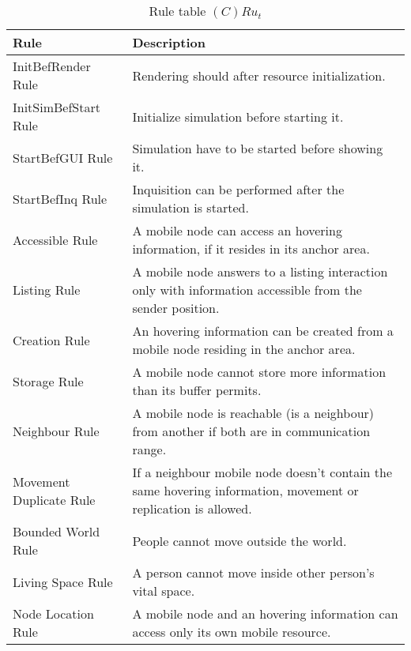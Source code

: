 \begin{table}[H]
	\centering
	\begin{tabular}{|p{4cm}|p{8cm}|}
			\hline
			\textbf{Rule} & \textbf{Description} \\
			\hline
			InitBefRender Rule & Rendering should after resource initialization. \\
			\hline
			InitSimBefStart Rule & Initialize simulation before starting it.  \\
			\hline
			StartBefGUI Rule & Simulation have to be started before showing it.\\
			\hline
			StartBefInq Rule & Inquisition can be performed after the simulation is
			started.\\
			\hline
			Accessible Rule & A mobile node can access an hovering information, if it
			resides in its anchor area. \\
			\hline
			Listing Rule & A mobile node answers to a listing interaction only with
			information accessible from the sender position. \\
			\hline
			Creation Rule & An hovering information can be created from a mobile node
			residing in the anchor area. \\
			\hline
			Storage Rule & A mobile node cannot store more information than its
			buffer permits. \\
			\hline
			Neighbour Rule & A mobile node is reachable (is a neighbour) from
			another if both are in communication range. \\
			\hline
			Movement Duplicate Rule & If a neighbour mobile node doesn't contain the same
			hovering information, movement or replication is allowed. \\
			\hline
			Bounded World Rule & People cannot move outside the world. \\
			\hline
			Living Space Rule & A person cannot move inside other person's vital space. \\
			\hline
			Node Location Rule & A mobile node and an hovering information can access
			only its own mobile resource. \\
			\hline
		\end{tabular}
	\caption{Rule table $(C)Ru_t$}
	\label{tab:crut}
\end{table}

